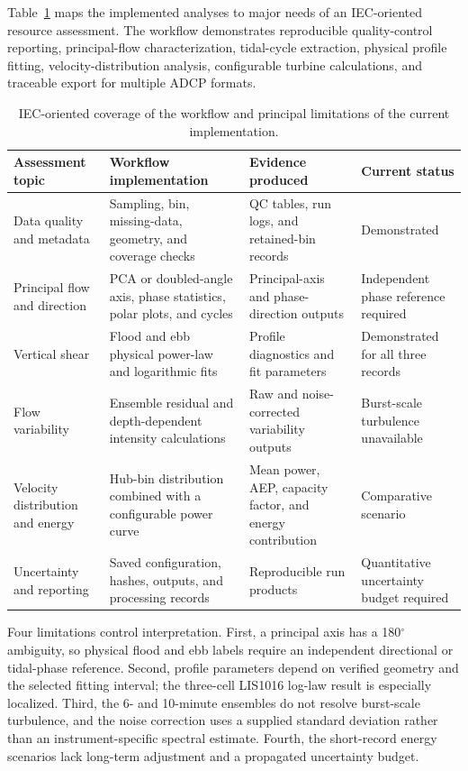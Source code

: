 \documentclass[12pt,sort&compress]{elsarticle}
\begin{document}
Table~\ref{tab:iec-traceability} maps the implemented analyses to major needs of an IEC-oriented resource assessment. The workflow demonstrates reproducible quality-control reporting, principal-flow characterization, tidal-cycle extraction, physical profile fitting, velocity-distribution analysis, configurable turbine calculations, and traceable export for multiple ADCP formats.

\begin{table}[tbp]
\centering
\caption{IEC-oriented coverage of the workflow and principal limitations of the current implementation.}
\label{tab:iec-traceability}
\small
\begin{tabular}{p{}p{}p{}p{}}
\toprule
Assessment topic & Workflow implementation & Evidence produced & Current status \\
\midrule
Data quality and metadata & Sampling, bin, missing-data, geometry, and coverage checks & QC tables, run logs, and retained-bin records & Demonstrated \\
Principal flow and direction & PCA or doubled-angle axis, phase statistics, polar plots, and cycles & Principal-axis and phase-direction outputs & Independent phase reference required \\
Vertical shear & Flood and ebb physical power-law and logarithmic fits & Profile diagnostics and fit parameters & Demonstrated for all three records \\
Flow variability & Ensemble residual and depth-dependent intensity calculations & Raw and noise-corrected variability outputs & Burst-scale turbulence unavailable \\
Velocity distribution and energy & Hub-bin distribution combined with a configurable power curve & Mean power, AEP, capacity factor, and energy contribution & Comparative scenario \\
Uncertainty and reporting & Saved configuration, hashes, outputs, and processing records & Reproducible run products & Quantitative uncertainty budget required \\
\bottomrule
\end{tabular}
\end{table}

Four limitations control interpretation. First, a principal axis has a 180$^{\circ}$ ambiguity, so physical flood and ebb labels require an independent directional or tidal-phase reference. Second, profile parameters depend on verified geometry and the selected fitting interval; the three-cell LIS1016 log-law result is especially localized. Third, the 6- and 10-minute ensembles do not resolve burst-scale turbulence, and the noise correction uses a supplied standard deviation rather than an instrument-specific spectral estimate. Fourth, the short-record energy scenarios lack long-term adjustment and a propagated uncertainty budget.
\end{document}
